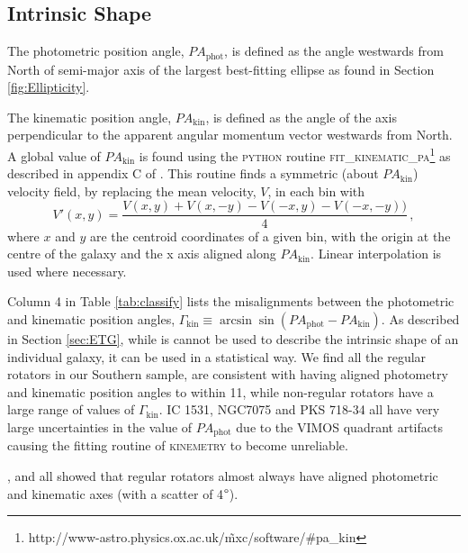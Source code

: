 		
		\subsection{Intrinsic Shape}
			\label{subsec:Misalignment}

			The photometric position angle, $PA_\text{phot}$, is defined as the angle westwards from North of semi-major axis of the largest best-fitting ellipse as found in Section \ref{fig:Ellipticity}.  

			The kinematic position angle, $PA_\text{kin}$, is defined as the angle of the axis perpendicular to the apparent angular momentum vector westwards from North. A global value of $PA_\text{kin}$ is found using the \textsc{python} routine \textsc{fit\_kinematic\_pa}\footnote{http://www-astro.physics.ox.ac.uk/\~mxc/software/\#pa\_kin} as described in appendix C of \citet{krajnovic2006}. This routine finds a symmetric (about $PA_\text{kin}$) velocity field, by replacing the mean velocity, $V$, in each bin with
			\begin{equation}
				V'(x, y) = \frac{V(x,y) + V(x, -y) - V(-x,y) - V(-x,-y))}{4} \,,
			\end{equation}
			where $x$ and $y$ are the centroid coordinates of a given bin, with the origin at the centre of the galaxy and the x axis aligned along $PA_\text{kin}$. Linear interpolation is used where necessary.

			Column 4 in Table \ref{tab:classify} lists the misalignments between the photometric and kinematic position angles, $\Gamma_\text{kin} \equiv \arcsin\sin\left( PA_\text{phot} - PA_\text{kin} \right)$. As described in Section \ref{sec:ETG}, while is cannot be used to describe the intrinsic shape of an individual galaxy, it can be used in a statistical way. We find all the regular rotators in our Southern sample, are consistent with having aligned photometry and kinematic position angles to within 11\degree, while non-regular rotators have a large range of values of $\Gamma_\text{kin}$. IC 1531, NGC7075 and PKS 718-34 all have very large uncertainties in the value of $PA_\text{phot}$ due to the VIMOS quadrant artifacts causing the fitting routine of \textsc{kinemetry} to become unreliable. 


			






			\citet{Cappellari2007}, \citet{Krajnovic2011} and \citet{Fogarty2015} all showed that regular rotators almost always have aligned photometric and kinematic axes (with a scatter of 4$\degree$). 

